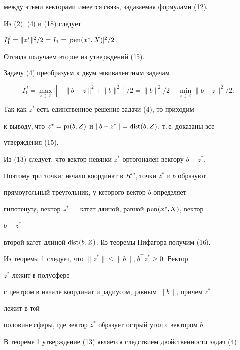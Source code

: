 \begin{pf}
между этими векторами имеется связь, задаваемая формулами (12).





Из (2), (4) и (18) следует


$I^d_1=\|z^*\|^2/2=I_1=[\operatorname{pen}(x^*,X)]^2/2$.


Отсюда получаем второе из утверждений (15).





Задачу (4) преобразуем к двум эквивалентным задачам


$$


I^d_1=\max_{z\in Z}[-\|b-z\|^2+\|b\|^2]/2=


\|b\|^2/2-\min_{z\in Z}\|b-z\|^2/2.


$$


Так как $z^*$ есть единственное решение задачи (4), то приходим


к выводу, что $z^*=\operatorname{pr}(b,Z)$ и $\|b-z^*\|=\operatorname{dist}(b,Z)$, т.\,е. доказаны все 


утверждения (15).





Из (13) следует, что вектор невязки $z^*$ ортогонален вектору $b-z^*$.


Поэтому три точки: начало координат в $R^m$, точки $z^*$ и $b$ образуют


прямоугольный треугольник, у которого вектор $b$ определяет


гипотенузу, вектор $z^*$ --- катет длиной, равной $\operatorname{pen}(x^*,X)$, вектор 


$b-z^*$ ---


второй катет длиной $\operatorname{dist}(b,Z)$. Из теоремы Пифагора получим (16).


\end{pf}





Из теоремы 1 следует, что $\|z^*\|\le\|b\|$, $b^\top z^*\ge0$. Вектор 


$z^*$ лежит в полусфере


с центром в начале координат и радиусом, равным $\|b\|$, причем $z^*$ 


лежит в той


половине сферы, где вектор $z^*$ образует острый угол с вектором $b$.





В теореме 1 утверждение (13) является следствием двойственности задач (4) 


